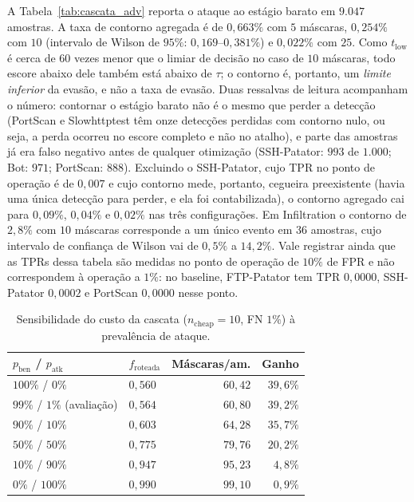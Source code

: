 \documentclass[conference]{IEEEtran}
\begin{document}
A Tabela~\ref{tab:cascata_adv} reporta o ataque ao estágio barato em $9.047$ amostras.
A taxa de contorno agregada é de $0{,}663\%$ com $5$ máscaras, $0{,}254\%$ com $10$ (intervalo de Wilson de $95\%$: $0{,}169$–$0{,}381\%$) e $0{,}022\%$ com $25$.
Como $t_{\text{low}}$ é cerca de $60$ vezes menor que o limiar de decisão no caso de $10$ máscaras, todo escore abaixo dele também está abaixo de $\tau$; o contorno é, portanto, um \emph{limite inferior} da evasão, e não a taxa de evasão.
Duas ressalvas de leitura acompanham o número: contornar o estágio barato não é o mesmo que perder a detecção (PortScan e Slowhttptest têm onze detecções perdidas com contorno nulo, ou seja, a perda ocorreu no escore completo e não no atalho), e parte das amostras já era falso negativo antes de qualquer otimização (SSH-Patator: $993$ de $1.000$; Bot: $971$; PortScan: $888$).
Excluindo o SSH-Patator, cujo TPR no ponto de operação é de $0{,}007$ e cujo contorno mede, portanto, cegueira preexistente (havia uma única detecção para perder, e ela foi contabilizada), o contorno agregado cai para $0{,}09\%$, $0{,}04\%$ e $0{,}02\%$ nas três configurações.
Em Infiltration o contorno de $2{,}8\%$ com $10$ máscaras corresponde a um único evento em $36$ amostras, cujo intervalo de confiança de Wilson vai de $0{,}5\%$ a $14{,}2\%$.
Vale registrar ainda que as TPRs dessa tabela são medidas no ponto de operação de $10\%$ de FPR e não correspondem à operação a $1\%$: no baseline, FTP-Patator tem TPR $0{,}0000$, SSH-Patator $0{,}0002$ e PortScan $0{,}0000$ nesse ponto.

\begin{table}[!t]
\centering
\footnotesize
\setlength{\tabcolsep}{4pt}
\caption{Sensibilidade do custo da cascata ($n_{\text{cheap}}=10$, FN $1\%$) à prevalência de ataque.}
\label{tab:prevalencia}
\begin{tabular}{@{}llrr@{}}
\toprule
\textbf{$p_{\text{ben}}$ / $p_{\text{atk}}$} & \textbf{$f_{\text{roteada}}$} & \textbf{Máscaras/am.} & \textbf{Ganho} \\
\midrule
$100\%$ / $0\%$ & $0{,}560$ & $60{,}42$ & $39{,}6\%$ \\
$99\%$ / $1\%$ (avaliação) & $0{,}564$ & $60{,}80$ & $39{,}2\%$ \\
$90\%$ / $10\%$ & $0{,}603$ & $64{,}28$ & $35{,}7\%$ \\
$50\%$ / $50\%$ & $0{,}775$ & $79{,}76$ & $20{,}2\%$ \\
$10\%$ / $90\%$ & $0{,}947$ & $95{,}23$ & $4{,}8\%$ \\
$0\%$ / $100\%$ & $0{,}990$ & $99{,}10$ & $0{,}9\%$ \\
\bottomrule
\end{tabular}
\end{table}
\end{document}
